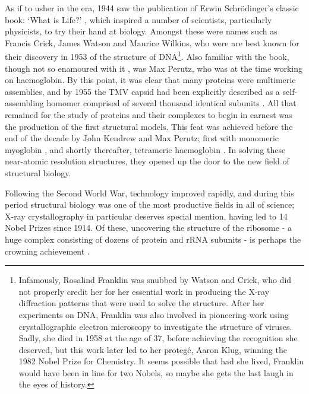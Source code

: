 \documentclass[a4paper,11pt,twoside,openright]{scrbook}
\begin{document}
As if to usher in the era, 1944 saw the publication of Erwin Schrödinger's
classic book: `What is Life?' \cite{Schrodinger1947}, which inspired a number of
scientists, particularly physicists, to try their hand at biology. Amongst these
were names such as Francis Crick, James Watson and Maurice Wilkins, who were are
best known for their discovery in 1953 of the structure of
DNA\footnote{Infamously, Rosalind Franklin was snubbed by Watson and Crick, who
did not properly credit her for her essential work in producing the X-ray
diffraction patterns that were used to solve the structure. After her
experiments on DNA, Franklin was also involved in pioneering work using
crystallographic electron microscopy to investigate the structure of viruses.
Sadly, she died in 1958 at the age of 37, before achieving the recognition she
deserved, but this work later led to her protegé, Aaron Klug, winning the 1982
Nobel Prize for Chemistry. It seems possible that had she lived, Franklin would
have been in line for two Nobels, so maybe she gets the last laugh in the eyes
of history.}. Also familiar with the book, though not so enamoured with it
\cite{Dronamraju1999}, was Max Perutz, who was at the time working on
haemoglobin. By this point, it was clear that many proteins were multimeric
assemblies, and by 1955 the TMV capsid had been explicitly described as a
self-assembling homomer comprised of several thousand identical subunits
\cite{Fraenkel-Conrat1955}. All that remained for the study of proteins and
their complexes to begin in earnest was the production of the first structural
models. This feat was achieved before the end of the decade by John Kendrew and
Max Perutz; first with monomeric myoglobin \cite{Kendrew1958}, and shortly
thereafter, tetrameric haemoglobin \cite{Perutz1960}. In solving these
near-atomic resolution structures, they opened up the door to the new field of
structural biology.

Following the Second World War, technology improved rapidly, and during this
period structural biology was one of the most productive fields in all of
science; X-ray crystallography in particular deserves special mention, having
led to 14 Nobel Prizes since 1914. Of these, uncovering the structure of the
ribosome - a huge complex consisting of dozens of protein and rRNA subunits - is
perhaps the crowning achievement \cite{Schluenzen2000,Ramakrishnan2000,Ban2000}.
\end{document}

